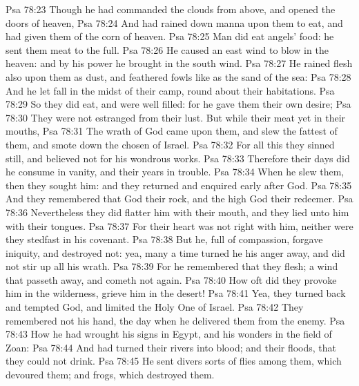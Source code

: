 \vs Psa 78:23 Though he had commanded the clouds from above, and opened the doors of heaven,
\vs Psa 78:24 And had rained down manna upon them to eat, and had given them of the corn of heaven.
\vs Psa 78:25 Man did eat angels' food: he sent them meat to the full.
\vs Psa 78:26 He caused an east wind to blow in the heaven: and by his power he brought in the south wind.
\vs Psa 78:27 He rained flesh also upon them as dust, and feathered fowls like as the sand of the sea:
\vs Psa 78:28 And he let  fall in the midst of their camp, round about their habitations.
\vs Psa 78:29 So they did eat, and were well filled: for he gave them their own desire;
\vs Psa 78:30 They were not estranged from their lust. But while their meat  yet in their mouths,
\vs Psa 78:31 The wrath of God came upon them, and slew the fattest of them, and smote down the chosen  of Israel.
\vs Psa 78:32 For all this they sinned still, and believed not for his wondrous works.
\vs Psa 78:33 Therefore their days did he consume in vanity, and their years in trouble.
\vs Psa 78:34 When he slew them, then they sought him: and they returned and enquired early after God.
\vs Psa 78:35 And they remembered that God  their rock, and the high God their redeemer.
\vs Psa 78:36 Nevertheless they did flatter him with their mouth, and they lied unto him with their tongues.
\vs Psa 78:37 For their heart was not right with him, neither were they stedfast in his covenant.
\vs Psa 78:38 But he,  full of compassion, forgave  iniquity, and destroyed  not: yea, many a time turned he his anger away, and did not stir up all his wrath.
\vs Psa 78:39 For he remembered that they  flesh; a wind that passeth away, and cometh not again.
\vs Psa 78:40 How oft did they provoke him in the wilderness,  grieve him in the desert!
\vs Psa 78:41 Yea, they turned back and tempted God, and limited the Holy One of Israel.
\vs Psa 78:42 They remembered not his hand,  the day when he delivered them from the enemy.
\vs Psa 78:43 How he had wrought his signs in Egypt, and his wonders in the field of Zoan:
\vs Psa 78:44 And had turned their rivers into blood; and their floods, that they could not drink.
\vs Psa 78:45 He sent divers sorts of flies among them, which devoured them; and frogs, which destroyed them.
